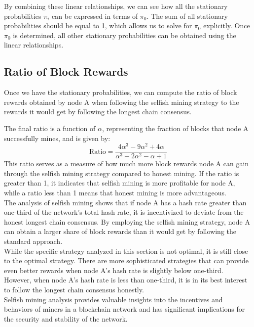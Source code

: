 By combining these linear relationships, we can see how all the stationary probabilities $\pi_i$ can be expressed in terms of $\pi_0$. The sum of all stationary probabilities should be equal to 1, which allows us to solve for $\pi_0$ explicitly. Once $\pi_0$ is determined, all other stationary probabilities can be obtained using the linear relationships.               

\subsection{Ratio of Block Rewards}
Once we have the stationary probabilities, we can compute the ratio of block rewards obtained by node A when following the selfish mining strategy to the rewards it would get by following the longest chain consensus.

The final ratio is a function of $\alpha$, representing the fraction of blocks that node A successfully mines, and is given by:
$$ \text{Ratio} = \frac{4\alpha^3 - 9\alpha^2 + 4\alpha}{\alpha^3 - 2\alpha^2 - \alpha + 1} $$
This ratio serves as a measure of how much more block rewards node A can gain through the selfish mining strategy compared to honest mining. If the ratio is greater than 1, it indicates that selfish mining is more profitable for node A, while a ratio less than 1 means that honest mining is more advantageous.\\

The analysis of selfish mining shows that if node A has a hash rate greater than one-third of the network's total hash rate, it is incentivized to deviate from the honest longest chain consensus. By employing the selfish mining strategy, node A can obtain a larger share of block rewards than it would get by following the standard approach.\\

While the specific strategy analyzed in this section is not optimal, it is still close to the optimal strategy. There are more sophisticated strategies that can provide even better rewards when node A's hash rate is slightly below one-third. However, when node A's hash rate is less than one-third, it is in its best interest to follow the longest chain consensus honestly.\\

Selfish mining analysis provides valuable insights into the incentives and behaviors of miners in a blockchain network and has significant implications for the security and stability of the network.

